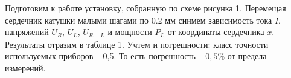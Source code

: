 \documentclass[a4paper, fontsize = 14pt]{article}
\begin{document}
Подготовим к работе установку, собранную по схеме рисунка 1. Перемещая сердечник катушки малыми шагами по 0.2 мм снимем зависимость тока $I$, напряжений $U_R$, $U_L$, $U_{R+L}$ и мощности $P_L$ от координаты сердечника $x$. Результаты отразим в таблице 1. Учтем и погрешности: класс точности используемых приборов -- 0,5. То есть погрешность -- $0,5\%$ от предела измерений. 

\begin{table}[hbt]
\centering
{}
\end{table}
\end{document}
